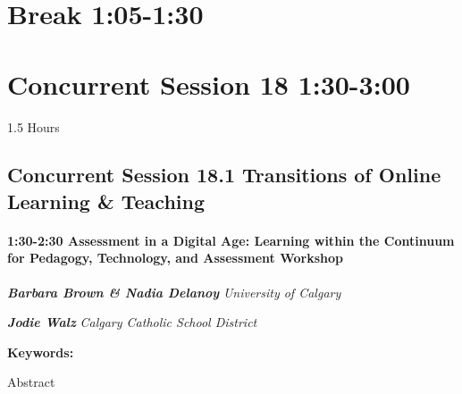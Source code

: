 \documentclass[
]{book}
\begin{document}
\hypertarget{break-105-130}{%
\section*{Break \textbar{} 1:05-1:30}\label{break-105-130}}

\hypertarget{concurrent-session-18-130-300}{%
\section*{Concurrent Session 18 \textbar{} 1:30-3:00}\label{concurrent-session-18-130-300}}

1.5 Hours

\hypertarget{concurrent-session-18.1-transitions-of-online-learning-teaching}{%
\subsection*{Concurrent Session 18.1 \textbar{} Transitions of Online Learning \& Teaching}\label{concurrent-session-18.1-transitions-of-online-learning-teaching}}

\begin{workshop}
\hypertarget{assessment-in-a-digital-age-learning-within-the-continuum-for-pedagogy-technology-and-assessment-workshop}{%
\paragraph*{\texorpdfstring{1:30-2:30 \textbar{} \textbf{Assessment in a
Digital Age: Learning within the Continuum for Pedagogy, Technology, and
Assessment} \textbar{}
Workshop}{1:30-2:30 \textbar{} Assessment in a Digital Age: Learning within the Continuum for Pedagogy, Technology, and Assessment \textbar{} Workshop}}\label{assessment-in-a-digital-age-learning-within-the-continuum-for-pedagogy-technology-and-assessment-workshop}}

\textbf{\emph{Barbara Brown \& Nadia Delanoy}} \textbar{}
\emph{University of Calgary}

\textbf{\emph{Jodie Walz}} \textbar{} \emph{Calgary Catholic School
District}

\textbf{Keywords:}

Abstract
\end{workshop}
\end{document}
